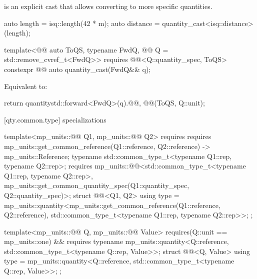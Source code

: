 \pnum
{} is an explicit cast that allows converting to more specific quantities.
\begin{example}
\begin{codeblock}
auto length = isq::length(42 * m);
auto distance = quantity_cast<isq::distance>(length);
\end{codeblock}
\end{example}

\begin{itemdecl}
template<@@ auto ToQS, typename FwdQ, @@ Q = std::remove_cvref_t<FwdQ>>
  requires @@<Q::quantity_spec, ToQS>
constexpr @@ auto quantity_cast(FwdQ&& q);
\end{itemdecl}

\begin{itemdescr}
\pnum
\effects
Equivalent to:
\begin{codeblock}
return quantity{std::forward<FwdQ>(q).@@, @@(ToQS, Q::unit)};
\end{codeblock}
\end{itemdescr}

[qty.common.type]{ specializations}

\begin{codeblock}
template<mp_units::@@ Q1, mp_units::@@ Q2>
  requires requires {
    { mp_units::get_common_reference(Q1::reference, Q2::reference) } -> mp_units::Reference;
    typename std::common_type_t<typename Q1::rep, typename Q2::rep>;
    requires mp_units::@@<std::common_type_t<typename Q1::rep, typename Q2::rep>,
                                        mp_units::get_common_quantity_spec(Q1::quantity_spec,
                                                                           Q2::quantity_spec)>;
  }
struct @@<Q1, Q2> {
  using type = mp_units::quantity<mp_units::get_common_reference(Q1::reference, Q2::reference),
                                  std::common_type_t<typename Q1::rep, typename Q2::rep>>;
};

template<mp_units::@@ Q, mp_units::@@ Value>
  requires(Q::unit == mp_units::one) && requires {
    typename mp_units::quantity<Q::reference, std::common_type_t<typename Q::rep, Value>>;
  }
struct @@<Q, Value> {
  using type = mp_units::quantity<Q::reference, std::common_type_t<typename Q::rep, Value>>;
};
\end{codeblock}

